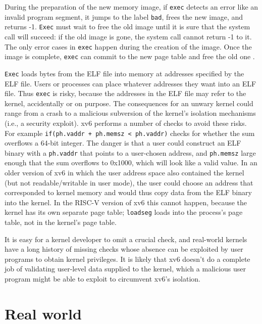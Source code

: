 During the preparation of the new memory image,
if
\lstinline{exec}
detects an error like an invalid program segment,
it jumps to the label
\lstinline{bad},
frees the new image,
and returns -1.
\lstinline{Exec}
must wait to free the old image until it
is sure that the system call will succeed:
if the old image is gone,
the system call cannot return -1 to it.
The only error cases in
\lstinline{exec}
happen during the creation of the image.
Once the image is complete,
\lstinline{exec}
can commit to the new page table
and free the old one
.

\lstinline{Exec}
loads bytes from the ELF file into memory at addresses specified by the ELF file.
Users or processes can place whatever addresses they want into an ELF file.
Thus
\lstinline{exec}
is risky, because the addresses in the ELF file may refer to the kernel, accidentally
or on purpose. The consequences for an unwary kernel could range from
a crash to a malicious subversion of the kernel's isolation mechanisms
(i.e., a security exploit).
xv6 performs a number of checks to avoid these risks.
For example
\lstinline{if(ph.vaddr + ph.memsz < ph.vaddr)}
checks for whether the sum overflows a 64-bit integer.
The danger is that a user could construct an ELF binary with a
\lstinline{ph.vaddr}
that points to a user-chosen address,
and
\lstinline{ph.memsz}
large enough that the sum overflows to 0x1000, which will look like a
valid value. In an older version of xv6 in which the user address
space also contained the kernel (but not readable/writable in user
mode), the user could choose an address that corresponded to kernel
memory and would thus copy data from the ELF binary into the kernel.
In the RISC-V version of xv6 this cannot happen, because the kernel has
its own separate page table;
\lstinline{loadseg}
loads into the process's page table, not in the kernel's page table.

It is easy for a kernel developer to omit a crucial check, and
real-world kernels have a long history of missing checks whose absence
can be exploited by user programs to obtain kernel privileges.  It is likely that xv6 doesn't do a complete job of validating
user-level data supplied to the kernel, which a malicious user program might be able to exploit to circumvent xv6's isolation.
\section{Real world}

